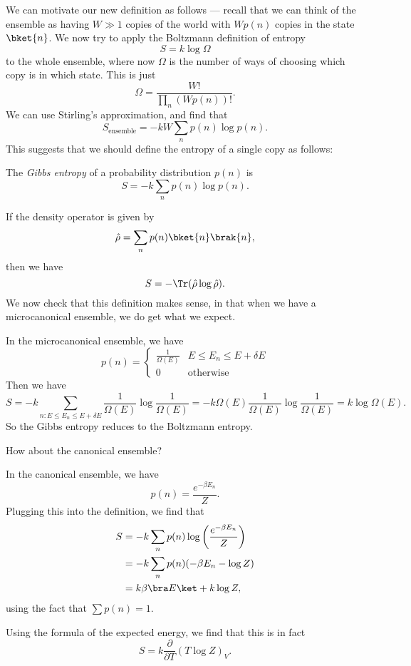\documentclass[a4paper]{article}
\begin{document}
We can motivate our new definition as follows --- recall that we can think of the ensemble as having $W \gg 1$ copies of the world with $Wp(n)$ copies in the state $\bket{n}$. We now try to apply the Boltzmann definition of entropy
\[
  S = k \log \Omega
\]
to the whole ensemble, where now $\Omega$ is the number of ways of choosing which copy is in which state. This is just
\[
  \Omega = \frac{W!}{\prod_n (W p(n))!}.
\]
We can use Stirling's approximation, and find that
\[
  S_{\mathrm{ensemble}} = -kW \sum_n p(n) \log p(n).
\]
This suggests that we should define the entropy of a single copy as follows:
\begin{defi}
  The \emph{Gibbs entropy} of a probability distribution $p(n)$ is
  \[
    S = -k \sum_n p(n) \log p(n).
  \]
\end{defi}
If the density operator is given by
\[
  \hat{\rho} = \sum_n p(n) \bket{n}\brak{n},
\]
then we have
\[
  S = - \Tr(\hat{\rho} \log \hat{\rho}).
\]
We now check that this definition makes sense, in that when we have a microcanonical ensemble, we do get what we expect.
\begin{eg}
  In the microcanonical ensemble, we have
  \[
    p(n) =
    \begin{cases}
      \frac{1}{\Omega(E)} & E \leq E_n \leq E + \delta E\\
      0 & \text{otherwise}
    \end{cases}
  \]
  Then we have
  \[
    S = -k \sum_{n: E \leq E_n \leq E + \delta E} \frac{1}{\Omega(E)} \log \frac{1}{\Omega(E)} = -k \Omega(E) \frac{1}{\Omega(E)} \log \frac{1}{\Omega(E)} = k \log \Omega(E).
  \]
  So the Gibbs entropy reduces to the Boltzmann entropy.
\end{eg}

How about the canonical ensemble?
\begin{eg}
  In the canonical ensemble, we have
  \[
    p(n) = \frac{e^{-\beta E_n}}{Z}.
  \]
  Plugging this into the definition, we find that
  \begin{align*}
    S &= -k \sum_n p(n) \log \left(\frac{e^{-\beta E_n}}{Z}\right)\\
    &= -k \sum_n p(n) (-\beta E_n - \log Z)\\
    &= k \beta \bra E\ket + k\log Z,
  \end{align*}
  using the fact that $\sum p(n) = 1$.

  Using the formula of the expected energy, we find that this is in fact
  \[
    S = k \frac{\partial}{\partial T} (T \log Z)_V.
  \]
\end{eg}
\end{document}
